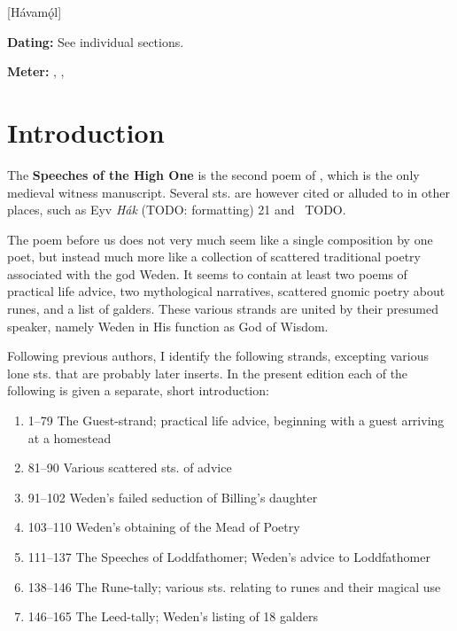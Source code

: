 [Hávamǫ́l]

\begin{flushright}%
\textbf{Dating:} See individual sections.

\textbf{Meter:} \Ljodahattr, \Galdralag, \Malahattr
\end{flushright}%

\section{Introduction}

The \textbf{Speeches of the High One} is the second poem of \Regius, which is the only medieval witness manuscript.  Several sts. are however cited or alluded to in other places, such as Eyv \emph{Hák} (TODO: formatting) 21 and \FostrbroedhraSaga\ TODO.

The poem before us does not very much seem like a single composition by one poet, but instead much more like a collection of scattered traditional poetry associated with the god Weden.  It seems to contain at least two poems of practical life advice, two mythological narratives, scattered gnomic poetry about runes, and a list of galders.  These various strands are united by their presumed speaker, namely Weden in His function as God of Wisdom.

Following previous authors, I identify the following strands, excepting various lone sts. that are probably later inserts.  In the present edition each of the following is given a separate, short introduction:

\begin{enumerate}
	\item 1–79 The Guest-strand; practical life advice, beginning with a guest arriving at a homestead
  \item 81–90 Various scattered sts. of advice
  \item 91–102 Weden’s failed seduction of Billing’s daughter
  \item 103–110 Weden’s obtaining of the Mead of Poetry
  \item 111–137 The Speeches of Loddfathomer; Weden’s advice to Loddfathomer
  \item 138–146 The Rune-tally; various sts. relating to runes and their magical use
  \item 146–165 The Leed-tally; Weden’s listing of 18 galders
\end{enumerate}

